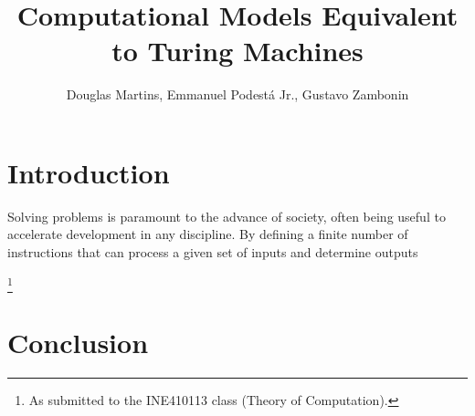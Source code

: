 \documentclass[12pt]{article}
\title{Computational Models Equivalent to Turing Machines}
\author{Douglas Martins\inst{1}, Emmanuel Podestá Jr.\inst{1}, Gustavo Zambonin\inst{1}}
\begin{document}
 

\maketitle

\section{Introduction}\label{sec:intro}
 
Solving problems is paramount to the advance of society, often being useful to accelerate development in any discipline. By defining a finite number of instructions that can process a given set of inputs and determine outputs 

\footnote{As submitted to the INE410113 class (Theory of Computation).}


\section{Conclusion}\label{sec:conc}




\end{document}
